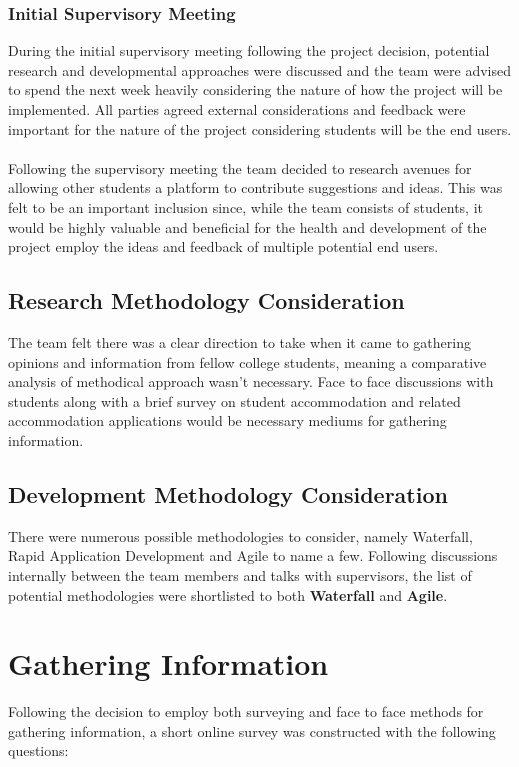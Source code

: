 \subsubsection{Initial Supervisory Meeting}
During the initial supervisory meeting following the project decision, potential research and developmental approaches were discussed and the team were advised to spend the next week heavily considering the nature of how the project will be implemented. All parties agreed external considerations and feedback were important for the nature of the project considering students will be the end users. 

\paragraph{}
Following the supervisory meeting the team decided to research avenues for allowing other students a platform to contribute suggestions and ideas. This was felt to be an important inclusion since, while the team consists of students, it would be highly valuable and beneficial for the health and development of the project employ the ideas and feedback of multiple potential end users.

\subsection{Research Methodology Consideration}
The team felt there was a clear direction to take when it came to gathering opinions and information from fellow college students, meaning a comparative analysis of methodical approach wasn't necessary. Face to face discussions with students along with a brief survey on student accommodation and related accommodation applications would be necessary mediums for gathering information.

\subsection{Development Methodology Consideration}
There were numerous possible methodologies to consider, namely Waterfall, Rapid Application Development and Agile to name a few. Following discussions internally between the team members and talks with supervisors, the list of potential methodologies were shortlisted to both \textbf{Waterfall} and \textbf{Agile}.

\section{Gathering Information}
Following the decision to employ both surveying and face to face methods for gathering information, a short online survey was constructed with the following questions:


